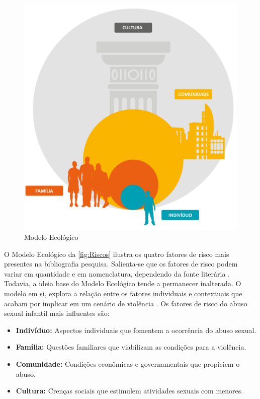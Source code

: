 \begin{figure}[htb]

	\caption{\label{fig:Riscos}Modelo Ecológico}
  \begin{center}
    \includegraphics[width=0.75\linewidth]{./Figuras/FatoresRisco.pdf}
	\end{center}

\end{figure}

O Modelo Ecológico da \autoref{fig:Riscos} ilustra os quatro fatores de risco mais presentes na bibliografia pesquisa. Salienta-se que os fatores de risco podem variar em quantidade e em nomenclatura, dependendo da fonte literária \cite{centers2004sexual, sexual2017department, blasco2018abuso, topromising}. Todavia, a ideia base do Modelo Ecológico tende a permanecer inalterada. O modelo em si, explora a relação entre os fatores individuais e contextuais que acabam por implicar em um cenário de violência \cite{dahlberg2006violencia}. Os fatores de risco do abuso sexual infantil mais influentes são:

\begin{itemize}
  \item \textbf{Indivíduo:} \hfill Aspectos individuais que fomentem a ocorrência do abuso sexual. %
  \item \textbf{Família:} \hfill Questões familiares que viabilizam as condições para a violência.  %
  \item \textbf{Comunidade:} Condições econômicas e governamentais que propiciem o abuso.
  \item \textbf{Cultura:} \hfill Crenças sociais que estimulem atividades sexuais com menores. 
\end{itemize}


